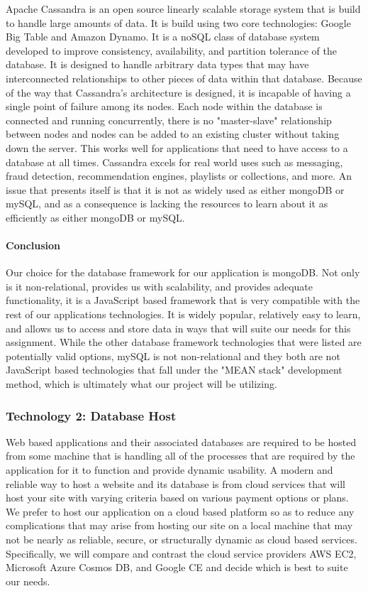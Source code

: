 		Apache Cassandra is an open source linearly scalable storage system that is build to handle large amounts of data. It is build using two core technologies: Google Big Table
		and Amazon Dynamo. It is a noSQL class of database system developed to improve consistency, availability, and partition tolerance of the database. It is designed
		to handle arbitrary data types that may have interconnected relationships to other pieces of data within that database. Because of the way that Cassandra's architecture 
		is designed, it is incapable of having a single point of failure among its nodes. Each node within the database is connected and running concurrently, there is no 
		"master-slave" relationship between nodes and nodes can be added to an existing cluster without taking down the server. This works well for applications that need to 
		have access to a database at all times. Cassandra excels for real world uses such as messaging, fraud detection, recommendation engines, playlists or collections, and more.
		An issue that presents itself is that it is not as widely used as either mongoDB or mySQL, and as a consequence is lacking the resources to learn about it as efficiently
		as either mongoDB or mySQL.
		
	\paragraph{Conclusion}
	
		Our choice for the database framework for our application is mongoDB. Not only is it non-relational, provides us with scalability, and provides adequate functionality, it is
		a JavaScript based framework that is very compatible with the rest of our applications technologies. It is widely popular, relatively easy to learn, and allows us
		to access and store data in ways that will suite our needs for this assignment. While the other database framework technologies that were listed are potentially valid options,
		mySQL is not non-relational and they both are not JavaScript based technologies that fall under the "MEAN stack" development method, which is ultimately what our project will be utilizing. 
		

\subsubsection{Technology 2: Database Host}

	Web based applications and their associated databases are required to be hosted from some machine that is handling all of the processes that are required by the application for it 
	to function and provide dynamic usability. A modern and reliable way to host a website and its database is from cloud services that will host your site with varying criteria
	based on various payment options or plans. We prefer to host our application on a cloud based platform so as to reduce any complications that may arise 
	from hosting our site on a local machine that may not be nearly as reliable, secure, or structurally dynamic as cloud based services. Specifically, we will
	compare and contrast the cloud service providers AWS EC2, Microsoft Azure Cosmos DB, and Google CE and decide which is best to suite our needs.
	
